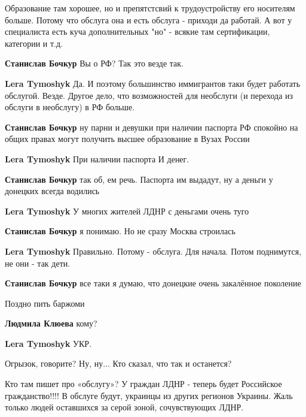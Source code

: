 \begin{itemize}
\begin{itemize} %

Образование там хорошее, но и препятстсвий к трудоустройству его носителям
больше. Потому что обслуга она и есть обслуга - приходи да работай. А вот у
специалиста есть куча дополнительных "но" - всякие там сертификации, категории
и т.д.


\textbf{Станислав Бочкур} Вы о РФ? Так это везде так.

\textbf{Lera Tymoshyk} Да. И поэтому большинство иммигрантов таки будет работать обслугой. Везде. Другое дело, что возможностей для необслуги (и перехода из обслуги в необслугу) в РФ больше.

\textbf{Станислав Бочкур} ну парни и девушки при наличии паспорта РФ спокойно на общих правах могут получить высшее образование в Вузах России

\textbf{Lera Tymoshyk} При наличии паспорта И денег.

\textbf{Станислав Бочкур} так об, ем речь. Паспорта им выдадут, ну а деньги у донецких всегда водились

\textbf{Lera Tymoshyk} У многих жителей ЛДНР с деньгами очень туго

\textbf{Станислав Бочкур} я понимаю. Но не сразу Москва строилась

\textbf{Lera Tymoshyk} Правильно. Потому - обслуга. Для начала.
Потом поднимутся, не они - так дети.

\textbf{Станислав Бочкур} все таки я думаю, что донецкие очень закалённое поколение

Поздно пить баржоми

\textbf{Людмила Клюева} кому?

\textbf{Lera Tymoshyk} УКР.
\end{itemize} %

Огрызок, говорите? Ну, ну... Кто сказал, что так и останется?


Кто там пишет про «обслугу»? У граждан ЛДНР - теперь будет Российское
гражданство!!!! В обслуге будут, украинцы из других регионов Украины. Жаль
только людей оставшихся за серой зоной, сочувствующих ЛДНР.




\end{itemize}
